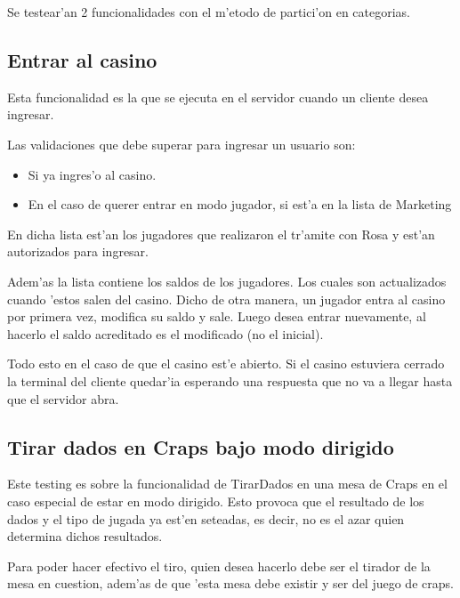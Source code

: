 Se testear'an 2 funcionalidades con el m'etodo de partici'on en categorias.


\subsection{Entrar al casino} 

Esta funcionalidad es la que se ejecuta en el servidor cuando un cliente desea ingresar.

Las validaciones que debe superar para ingresar un usuario son:
\begin{itemize}
\item Si ya ingres'o al casino.
\item En el caso de querer entrar en modo jugador, si est'a en la lista de Marketing
\end{itemize}

En dicha lista est'an los jugadores que realizaron el tr'amite con Rosa y est'an autorizados para ingresar.

Adem'as la lista contiene los saldos de los jugadores. Los cuales son actualizados cuando 'estos salen del casino. Dicho de otra manera, un jugador entra al casino por primera vez, modifica su saldo y sale. Luego desea entrar nuevamente, al hacerlo el saldo acreditado es el modificado (no el inicial).

Todo esto en el caso de que el casino est'e abierto. Si el casino estuviera cerrado la terminal del cliente quedar'ia esperando una respuesta que no va a llegar hasta que el servidor abra.



\clearpage


\subsection{Tirar dados en Craps bajo modo dirigido}

Este testing es sobre la funcionalidad de TirarDados en una mesa de Craps en el caso especial de estar en modo dirigido. Esto provoca que el resultado de los dados y el tipo de jugada ya est'en seteadas, es decir, no es el azar quien determina dichos resultados.

Para poder hacer efectivo el tiro, quien desea hacerlo debe ser el tirador de la mesa en cuestion, adem'as de que 'esta mesa debe existir y ser del juego de craps.

